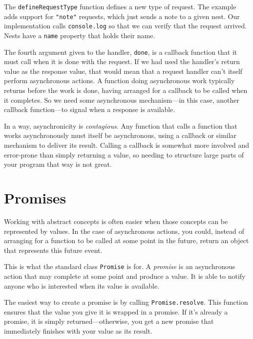 The \lstinline`defineRequestType` function defines a new type of request. The example adds support for \lstinline`"note"` requests, which just sends a note to a given nest. Our implementation calls \lstinline`console.log` so that we can verify that the request arrived. Nests have a \lstinline`name` property that holds their name.

The fourth argument given to the handler, \lstinline`done`, is a callback function that it must call when it is done with the request. If we had used the handler's return value as the response value, that would mean that a request handler can't itself perform asynchronous actions. A function doing asynchronous work typically returns before the work is done, having arranged for a callback to be called when it completes. So we need some asynchronous mechanism—in this case, another callback function—to signal when a response is available.

In a way, asynchronicity is \emph{contagious}. Any function that calls a function that works asynchronously must itself be asynchronous, using a callback or similar mechanism to deliver its result. Calling a callback is somewhat more involved and error-prone than simply returning a value, so needing to structure large parts of your program that way is not great.

\section{Promises}

Working with abstract concepts is often easier when those concepts can be represented by values. In the case of asynchronous actions, you could, instead of arranging for a function to be called at some point in the future, return an object that represents this future event.

This is what the standard class \lstinline`Promise` is for. A \emph{promise} is an asynchronous action that may complete at some point and produce a value. It is able to notify anyone who is interested when its value is available.

The easiest way to create a promise is by calling \lstinline`Promise.resolve`. This function ensures that the value you give it is wrapped in a promise. If it's already a promise, it is simply returned—otherwise, you get a new promise that immediately finishes with your value as its result.

